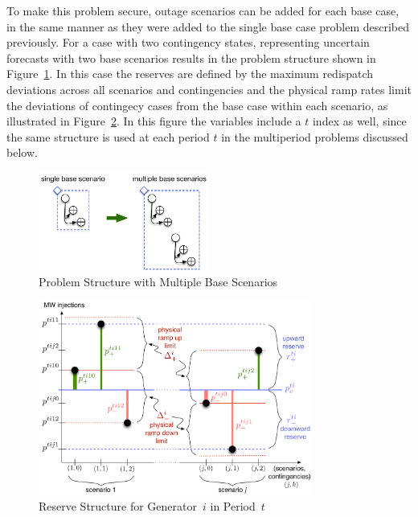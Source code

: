 \documentclass[12pt]{article}
\numberwithin{equation}{section}
\numberwithin{table}{section}
\numberwithin{figure}{section}
\begin{document}
To make this problem secure, outage scenarios can be added for each base case, in the same manner as they were added to the single base case problem described previously. For a case with two contingency states, representing uncertain forecasts with two base scenarios results in the problem structure shown in Figure~\ref{fig:structure_multi_scenario}. In this case the reserves are defined by the maximum redispatch deviations across all scenarios and contingencies and the physical ramp rates limit the deviations of contingecy cases from the base case within each scenario, as illustrated in Figure~\ref{fig:reserves}. In this figure the variables include a $t$ index as well, since the same structure is used at each period $t$ in the multiperiod problems discussed below.

\begin{figure}[hbtp]
  \centering
  \includegraphics[width=0.5\textwidth]{./figures/structure-multi-scenario}
  \caption{Problem Structure with Multiple Base Scenarios}
  \label{fig:structure_multi_scenario}
\end{figure}

\begin{figure}[hbtp]
  \centering
  \includegraphics[width=0.8\textwidth]{./figures/reserves}
  \caption{Reserve Structure for Generator~$i$ in Period~$t$}
  \label{fig:reserves}
\end{figure}
\end{document}
